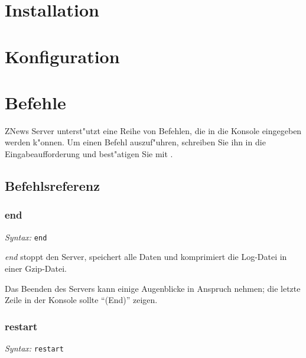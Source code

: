 

\newcommand*{\thetitle}{ZNews Server\\ Bedienungsanleitung}

\Begin

\section{Installation}


\pagebreak
\section{Konfiguration}%
\label{sec:config}


\section{Befehle}

ZNews Server unterst"utzt eine Reihe von Befehlen,
die in die Konsole eingegeben werden k"onnen.
Um einen Befehl auszuf"uhren, schreiben Sie ihn
in die Eingabeaufforderung und best"atigen Sie
mit .

\subsection{Befehlsreferenz}

\subsubsection{end}

\hspace*{2cm}\emph{Syntax: } \lstinline{end}
\vspace*{0.2cm}

\emph{end} stoppt den Server, speichert alle Daten
und komprimiert die Log-Datei in einer Gzip-Datei.

Das Beenden des Servers kann einige Augenblicke
in Anspruch nehmen; die letzte Zeile in der
Konsole sollte ``(End)'' zeigen.

\subsubsection{restart}

\hspace*{2cm}\emph{Syntax: } \lstinline{restart}
\vspace*{0.2cm}

